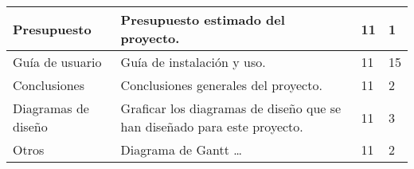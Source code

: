 \begin{table}[h!]
\begin{tabular}{|p{4cm}|p{7.2cm}|p{1.3cm}|p{2.1cm}|}
Presupuesto                        & Presupuesto estimado del proyecto.
          & 11                             & 1                                  \\ \hline          

Guía de usuario                        & Guía de instalación y uso.
          & 11                             & 15                                  \\ \hline

Conclusiones                        & Conclusiones generales del proyecto.
          & 11                             & 2                                  \\ \hline

Diagramas de diseño                        & Graficar los diagramas de diseño que se han diseñado para este proyecto.
          & 11                             & 3                                  \\ \hline

Otros                    & Diagrama de Gantt \ldots 
          & 11                             & 2                                  \\ \hline

\end{tabular}
\end{table}